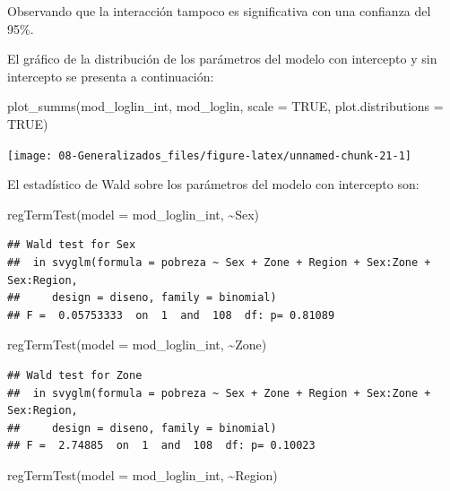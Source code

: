 \documentclass[
  12pt,
]{book}
\newenvironment{Shaded}{\begin{snugshade}}{\end{snugshade}}
\newcommand{\AttributeTok}[1]{\textcolor[rgb]{0.77,0.63,0.00}{#1}}
\newcommand{\ConstantTok}[1]{\textcolor[rgb]{0.00,0.00,0.00}{#1}}
\newcommand{\FunctionTok}[1]{\textcolor[rgb]{0.00,0.00,0.00}{#1}}
\newcommand{\NormalTok}[1]{#1}
\newcommand{\SpecialCharTok}[1]{\textcolor[rgb]{0.00,0.00,0.00}{#1}}
\begin{document}
Observando que la interacción tampoco es significativa con una confianza del 95\%.

El gráfico de la distribución de los parámetros del modelo con intercepto y sin intercepto se presenta a continuación:

\begin{Shaded}
\begin{Highlighting}[]
\FunctionTok{plot\_summs}\NormalTok{(mod\_loglin\_int, mod\_loglin, }\AttributeTok{scale =} \ConstantTok{TRUE}\NormalTok{, }\AttributeTok{plot.distributions =} \ConstantTok{TRUE}\NormalTok{)}
\end{Highlighting}
\end{Shaded}

\texttt{[image: 08-Generalizados\_files/figure-latex/unnamed-chunk-21-1]}

El estadístico de Wald sobre los parámetros del modelo con intercepto son:

\begin{Shaded}
\begin{Highlighting}[]
  \FunctionTok{regTermTest}\NormalTok{(}\AttributeTok{model =}\NormalTok{ mod\_loglin\_int, }\SpecialCharTok{\textasciitilde{}}\NormalTok{Sex)}
\end{Highlighting}
\end{Shaded}

\begin{verbatim}
## Wald test for Sex
##  in svyglm(formula = pobreza ~ Sex + Zone + Region + Sex:Zone + Sex:Region, 
##     design = diseno, family = binomial)
## F =  0.05753333  on  1  and  108  df: p= 0.81089
\end{verbatim}

\begin{Shaded}
\begin{Highlighting}[]
  \FunctionTok{regTermTest}\NormalTok{(}\AttributeTok{model =}\NormalTok{ mod\_loglin\_int, }\SpecialCharTok{\textasciitilde{}}\NormalTok{Zone)}
\end{Highlighting}
\end{Shaded}

\begin{verbatim}
## Wald test for Zone
##  in svyglm(formula = pobreza ~ Sex + Zone + Region + Sex:Zone + Sex:Region, 
##     design = diseno, family = binomial)
## F =  2.74885  on  1  and  108  df: p= 0.10023
\end{verbatim}

\begin{Shaded}
\begin{Highlighting}[]
  \FunctionTok{regTermTest}\NormalTok{(}\AttributeTok{model =}\NormalTok{ mod\_loglin\_int, }\SpecialCharTok{\textasciitilde{}}\NormalTok{Region)}
\end{Highlighting}
\end{Shaded}
\end{document}
